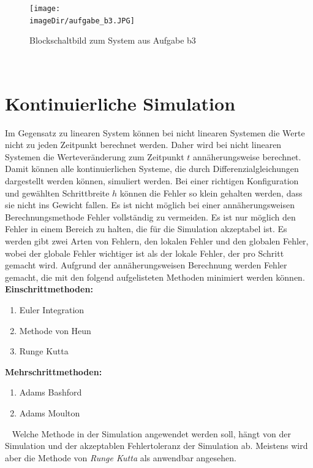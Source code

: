 \documentclass[11pt, a4paper, twoside]{article}   	%
\newcommand{\imageDir}{./images/}
\begin{document}
\begin{figure}
\centering
\texttt{[image: \\imageDir/aufgabe\_b3.JPG]}
\caption{Blockschaltbild zum System aus Aufgabe b3}
\label{fig:exercise-b1}
\end{figure}
\ \newpage

\section{Kontinuierliche Simulation}
\label{sec:continous-simulation}
Im Gegensatz zu linearen System können bei nicht linearen Systemen die Werte nicht zu jeden Zeitpunkt berechnet werden. Daher wird bei nicht linearen Systemen die Werteveränderung zum Zeitpunkt $t$ annäherungsweise berechnet. Damit können alle kontinuierlichen Systeme, die durch Differenzialgleichungen dargestellt werden können, simuliert werden. Bei einer richtigen Konfiguration und gewählten Schrittbreite $h$ können die Fehler so klein gehalten werden, dass sie nicht ins Gewicht fallen. 
\newline
\newline
Es ist nicht möglich bei einer annäherungsweisen Berechnungsmethode Fehler vollständig zu vermeiden. Es ist nur möglich den Fehler in einem Bereich zu halten, die für die Simulation akzeptabel ist. Es werden gibt zwei Arten von Fehlern, den lokalen Fehler und den globalen Fehler, wobei der globale Fehler wichtiger ist als der lokale Fehler, der pro Schritt gemacht wird.
\newline
\newline
Aufgrund der annäherungsweisen Berechnung werden Fehler gemacht, die mit den folgend aufgelisteten Methoden minimiert werden können.
\newline
\newline
\textbf{Einschrittmethoden:}
\begin{enumerate}
	\item Euler Integration
	\item Methode von Heun
	\item Runge Kutta
\end{enumerate}
\textbf{Mehrschrittmethoden:}
\begin{enumerate}
	\item Adams Bashford
	\item Adams Moulton
\end{enumerate}
\ \newline
Welche Methode in der Simulation angewendet werden soll, hängt von der Simulation und der akzeptablen Fehlertoleranz der Simulation ab. Meistens wird aber die Methode von \emph{Runge Kutta} als anwendbar angesehen.
\end{document}
